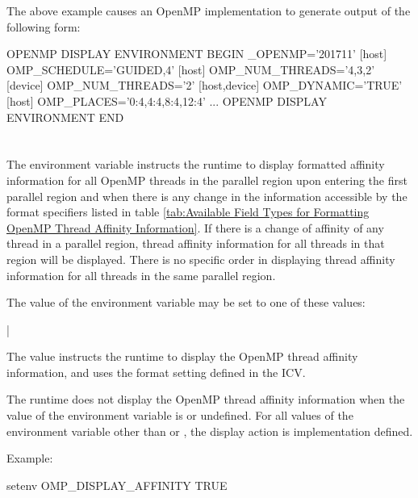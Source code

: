 The above example causes an OpenMP implementation to generate output of the
following form:

\begin{ompEnv}
OPENMP DISPLAY ENVIRONMENT BEGIN
  _OPENMP='201711'
  [host] OMP_SCHEDULE='GUIDED,4'
  [host] OMP_NUM_THREADS='4,3,2'
  [device] OMP_NUM_THREADS='2'
  [host,device] OMP_DYNAMIC='TRUE'
  [host] OMP_PLACES='{0:4},{4:4},{8:4},{12:4}'
  ...
OPENMP DISPLAY ENVIRONMENT END
\end{ompEnv}


\section{}
\label{sec:OMP_DISPLAY_AFFINITY}
The  environment variable instructs the runtime to
display formatted affinity information for all OpenMP threads in the parallel
region upon entering the first parallel region and when there is any change in
the information accessible by the format specifiers listed in table
\ref{tab:Available Field Types for Formatting OpenMP Thread Affinity Information}.
If there is a change of affinity of any thread in a parallel region, thread
affinity information for all threads in that region will be displayed.
There is no specific order in displaying thread affinity information for all
threads in the same parallel region.

The value of the  environment variable may be set to one of these
values:

{|}


The  value instructs the runtime to display the OpenMP thread affinity information, and uses the
format setting defined in the  ICV.

The runtime does not display the OpenMP thread affinity information when the value of the 
environment variable is  or undefined. For all values of the environment
variable other than  or , the display action is implementation defined.

Example:
\begin{ompEnv}
setenv OMP_DISPLAY_AFFINITY TRUE
\end{ompEnv}

